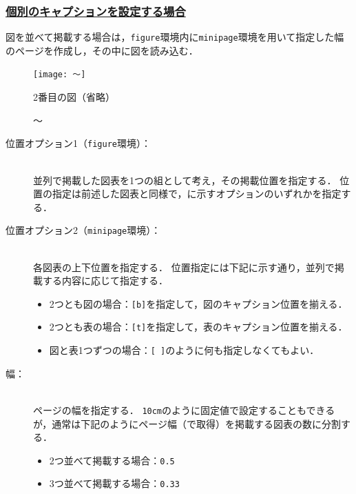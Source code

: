 \documentclass[a4j,11pt]{ujreport}
\begin{document}
\subsubsection{\underline{個別のキャプションを設定する場合}}
図を並べて掲載する場合は，\texttt{figure}環境内に\texttt{minipage}環境を用いて指定した幅のページを作成し，その中に図を読み込む．

\begin{code}
\begin{figure}[位置オプション1]
	\centering
	\begin{minipage}[位置オプション2]{幅}
		\centering
		\texttt{[image: 〜]}
		\caption{〜}
		\label{〜}
	\end{minipage}%
	\begin{minipage}[位置オプション2]{幅}
		2番目の図（省略）
	\end{minipage}
\end{figure}
\end{code}%

\begin{description}
\item[位置オプション1（\texttt{figure}環境）：]\mbox{}\\
並列で掲載した図表を1つの組として考え，その掲載位置を指定する．
位置の指定は前述した図表と同様で，に示すオプションのいずれかを指定する．

\item[位置オプション2（\texttt{minipage}環境）：]\mbox{}\\
各図表の上下位置を指定する．
位置指定には下記に示す通り，並列で掲載する内容に応じて指定する．
\begin{itemize}
\item 2つとも図の場合：\texttt{[b]}を指定して，図のキャプション位置を揃える．
\item 2つとも表の場合：\texttt{[t]}を指定して，表のキャプション位置を揃える．
\item 図と表1つずつの場合：\texttt{[\,]}のように何も指定しなくてもよい．
\end{itemize}

\item[幅：]\mbox{}\\
ページの幅を指定する．
\texttt{10cm}のように固定値で設定することもできるが，通常は下記のようにページ幅（で取得）を掲載する図表の数に分割する．
\begin{itemize}
\item 2つ並べて掲載する場合：\texttt{0.5}
\item 3つ並べて掲載する場合：\texttt{0.33}
\end{itemize}
\end{description}
\end{document}
